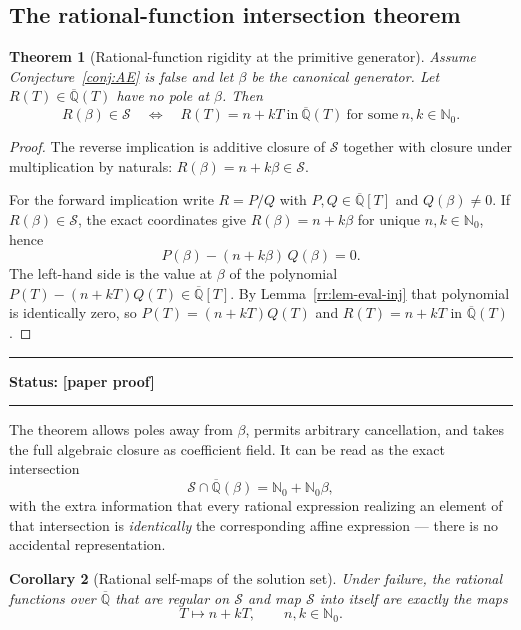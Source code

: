 \documentclass[11pt,oneside]{article}
\newtheorem{theorem}{Theorem}[section]
\newtheorem{corollary}[theorem]{Corollary}
\theoremstyle{definition}
\theoremstyle{remark}
\newcommand{\Nzero}{\mathbb N_0}
\newcommand{\Abar}{\overline{\mathbb Q}}
\newcommand{\Sol}{\mathcal S}
\newcommand{\statusnew}{\textcolor{newgreen}{\textbf{[paper proof]}}}
\newenvironment{statusbox}[1]
{\begin{center}\begin{minipage}{0.94\textwidth}\raggedright\hbadness=10000\hrule
\vspace{0.45em}\textbf{Status:} #1\par\vspace{0.35em}}
{\vspace{0.35em}\hrule\end{minipage}\end{center}}
\begin{document}
\subsection{The rational-function intersection theorem}

\begin{theorem}[Rational-function rigidity at the primitive generator]
\label{rr:thm-rational-rigidity}
Assume Conjecture~\ref{conj:AE} is false and let $\beta$ be the canonical generator.  Let
$R(T)\in\Abar(T)$ have no pole at $\beta$.  Then
\[
 \boxed{\quad
 R(\beta)\in\Sol
 \quad\Longleftrightarrow\quad
 R(T)=n+kT\ \text{in}\ \Abar(T)
 \ \text{for some}\ n,k\in\Nzero.
 \quad}
\]
\end{theorem}

\begin{proof}
The reverse implication is additive closure of $\Sol$ together with closure under
multiplication by naturals: $R(\beta)=n+k\beta\in\Sol$.

For the forward implication write $R=P/Q$ with $P,Q\in\Abar[T]$ and $Q(\beta)\ne0$.  If
$R(\beta)\in\Sol$, the exact coordinates give $R(\beta)=n+k\beta$ for unique
$n,k\in\Nzero$, hence
\[
 P(\beta)-(n+k\beta)\,Q(\beta)=0 .
\]
The left-hand side is the value at $\beta$ of the polynomial
$P(T)-(n+kT)Q(T)\in\Abar[T]$.  By Lemma~\ref{rr:lem-eval-inj} that polynomial is identically
zero, so $P(T)=(n+kT)Q(T)$ and $R(T)=n+kT$ in $\Abar(T)$.
\end{proof}

\begin{statusbox}{\statusnew}
\end{statusbox}

The theorem allows poles away from $\beta$, permits arbitrary cancellation, and takes the full
algebraic closure as coefficient field.  It can be read as the exact intersection
\begin{equation}
 \Sol\cap\Abar(\beta)=\Nzero+\Nzero\beta ,
 \label{rr:eq-intersection}
\end{equation}
with the extra information that every rational expression realizing an element of that
intersection is \emph{identically} the corresponding affine expression --- there is no
accidental representation.

\begin{corollary}[Rational self-maps of the solution set]
\label{rr:cor-selfmaps}
Under failure, the rational functions over $\Abar$ that are regular on $\Sol$ and map $\Sol$
into itself are exactly the maps
\[
 T\longmapsto n+kT,
 \qquad n,k\in\Nzero .
\]
\end{corollary}
\end{document}
